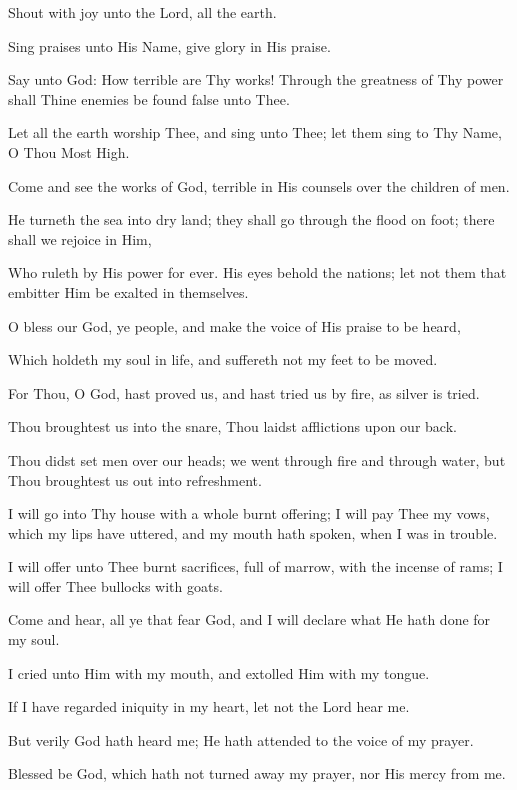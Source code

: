Shout with joy unto the Lord, all the earth.

Sing praises unto His Name, give glory in His praise.

Say unto God: How terrible are Thy works! Through the greatness of Thy power shall Thine enemies be found false unto Thee.

Let all the earth worship Thee, and sing unto Thee; let them sing to Thy Name, O Thou Most High.

Come and see the works of God, terrible in His counsels over the children of men.

He turneth the sea into dry land; they shall go through the flood on foot; there shall we rejoice in Him,

Who ruleth by His power for ever. His eyes behold the nations; let not them that embitter Him be exalted in themselves.

O bless our God, ye people, and make the voice of His praise to be heard,

Which holdeth my soul in life, and suffereth not my feet to be moved.

For Thou, O God, hast proved us, and hast tried us by fire, as silver is tried.

Thou broughtest us into the snare, Thou laidst afflictions upon our back.

Thou didst set men over our heads; we went through fire and through water, but Thou broughtest us out into refreshment.

I will go into Thy house with a whole burnt offering; I will pay Thee my vows, which my lips have uttered, and my mouth hath spoken, when I was in trouble.

I will offer unto Thee burnt sacrifices, full of marrow, with the incense of rams; I will offer Thee bullocks with goats.

Come and hear, all ye that fear God, and I will declare what He hath done for my soul.

I cried unto Him with my mouth, and extolled Him with my tongue.

If I have regarded iniquity in my heart, let not the Lord hear me.

But verily God hath heard me; He hath attended to the voice of my prayer.

Blessed be God, which hath not turned away my prayer, nor His mercy from me.
